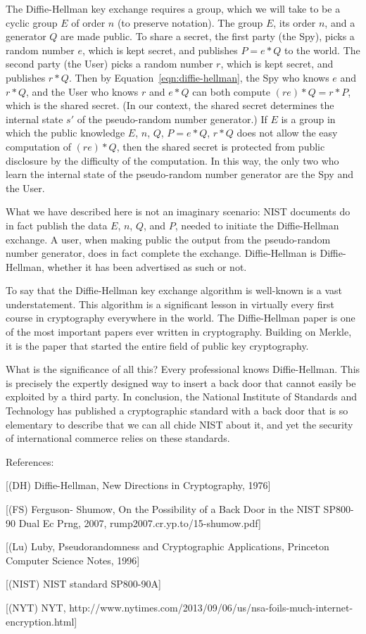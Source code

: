 \documentclass[11pt]{amsart} %
\begin{document}
The Diffie-Hellman key exchange requires a group, which  we will take to
be a cyclic group $E$ of order $n$ (to preserve notation).  
The group $E$, its order $n$, and a generator $Q$
are made public.    To share a secret, 
the first party  (the Spy), picks a random number $e$, which is kept
secret, and publishes $P = e * Q$ to the world.  
The second party (the User) picks a random number
$r$, which is kept secret, and publishes $r * Q$.   Then
by Equation~\ref{eqn:diffie-hellman}, 
the Spy who knows $e$ and $r *Q$, 
and the User who knows $r$ and $e * Q$ can both compute
$(r e) * Q = r * P$, which is the shared secret.
(In our context, the shared secret determines the internal state $s'$ of the pseudo-random number generator.)
If $E$ is a group in which the public knowledge $E$, $n$, $Q$, $P = e * Q$, $r * Q$ does not
allow the easy computation of $(r e) * Q$, then the shared secret is protected from public disclosure 
by the difficulty of the computation.  
In this way, the only two who learn the internal state
of the pseudo-random number generator are the Spy and the User.

What we have described here is not an imaginary scenario: NIST documents do in fact publish the
data $E$, $n$, $Q$, and $P$, needed to initiate the Diffie-Hellman exchange.
A user, when making public the output from the pseudo-random number generator, does in fact complete the
exchange.  Diffie-Hellman is Diffie-Hellman, whether it has been advertised as such or not.

To say that the Diffie-Hellman key exchange algorithm is well-known is a vast understatement.
This algorithm is a significant lesson in  virtually every first course in cryptography
 everywhere
in the world.
The Diffie-Hellman paper is one of the most important papers ever written in cryptography.
Building on Merkle, it is the paper that started the entire field of public key cryptography.

What is the significance of all this?   Every professional knows Diffie-Hellman.
This is precisely the expertly designed way to insert a back door that cannot easily be
exploited by a third party.  
In conclusion, the
National Institute of Standards and Technology has published a cryptographic standard with
a back door that is so elementary to describe that we can all chide
NIST about it, and yet the security of 
international commerce relies on these  standards.  


References:

[(DH) Diffie-Hellman, New Directions in Cryptography, 1976] 

[(FS) Ferguson- Shumow, On the Possibility of a Back Door in the NIST SP800-90 Dual Ec Prng, 2007, rump2007.cr.yp.to/15-shumow.pdf]

[(Lu) Luby, Pseudorandomness and Cryptographic Applications, Princeton Computer Science Notes, 1996]

[(NIST) NIST standard SP800-90A]

[(NYT) NYT, http://www.nytimes.com/2013/09/06/us/nsa-foils-much-internet-encryption.html]
\end{document}
